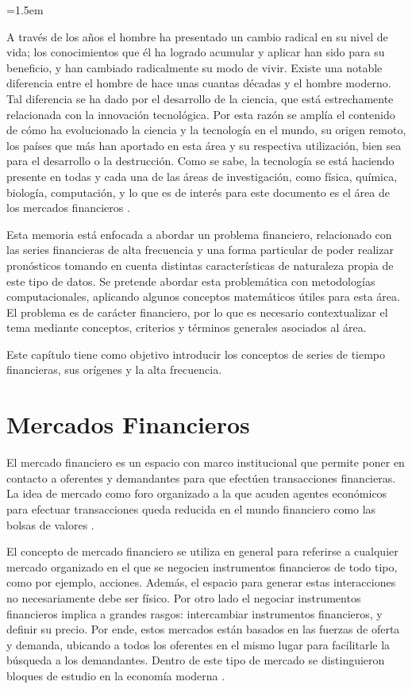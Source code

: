 \parindent=1.5em

A través de los años el hombre ha presentado un cambio radical en su nivel de vida; los conocimientos que él ha logrado acumular y aplicar han sido para su beneficio,
y han cambiado radicalmente su modo de vivir. Existe una notable diferencia entre el hombre de hace unas cuantas décadas y el hombre moderno. Tal diferencia se ha
dado por el desarrollo de la ciencia, que está estrechamente relacionada con la innovación tecnológica. Por esta razón se amplía el contenido de cómo ha
evolucionado la ciencia y la tecnología en el mundo, su origen remoto, los países que más han aportado en esta área y su respectiva utilización, bien sea para
el desarrollo o la destrucción. Como se sabe, la tecnología se está haciendo presente en todas y cada una de las áreas de investigación, como física, química, biología, 
computación, y lo que es de interés para este documento es el área de los mercados financieros \cite{watsham1997quantitative}.

Esta memoria está enfocada a abordar un problema financiero, relacionado con las series financieras de alta frecuencia y una forma particular
de poder realizar pronósticos tomando en cuenta distintas características de naturaleza propia de este tipo de datos. 
Se pretende abordar esta problemática con metodologías computacionales, aplicando algunos conceptos matemáticos
útiles para esta área. El problema es de carácter financiero, por lo que es necesario contextualizar el tema mediante conceptos, criterios 
y términos generales asociados al área.

Este capítulo tiene como objetivo introducir los conceptos de series de tiempo financieras, sus orígenes y la alta frecuencia.

\section{Mercados Financieros}

El mercado financiero es un espacio con marco institucional que permite poner en contacto a oferentes y demandantes para que efectúen
transacciones financieras. La idea de mercado como foro organizado a la que acuden agentes económicos para efectuar transacciones
queda reducida en el mundo financiero como las bolsas de valores \cite{mishkin2006financial}.

El concepto de mercado financiero se utiliza en general para referirse a cualquier mercado organizado en el que se negocien instrumentos financieros
de todo tipo, como por ejemplo, acciones. Además, el espacio para generar estas interacciones no necesariamente debe ser físico. Por otro lado el negociar
instrumentos financieros implica a grandes rasgos: intercambiar instrumentos financieros, y definir su precio. Por ende, estos mercados están basados en
las fuerzas de oferta y demanda, ubicando a todos los oferentes en el mismo lugar para facilitarle la búsqueda a los demandantes. Dentro
de este tipo de mercado se distinguieron bloques de estudio en la economía moderna \cite{jensen1984theory}.

